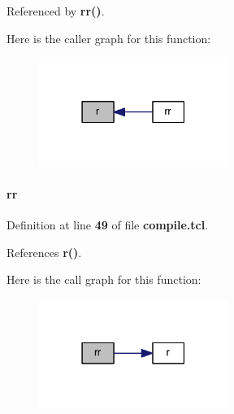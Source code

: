 Referenced by {\bf rr()}.



Here is the caller graph for this function\+:\nopagebreak
\begin{figure}[H]
\begin{center}
\leavevmode
\includegraphics[width=174pt]{d6/d9c/txiqmux_2compile_8tcl_a514f1b439f404f86f77090fa9edc96ce_icgraph}
\end{center}
\end{figure}


\paragraph[{rr}]{\setlength{\rightskip}{0pt plus 5cm}rr}\label{txiqmux_2compile_8tcl_aeb9279982226a42afdf2860dbdc29b45}


Definition at line {\bf 49} of file {\bf compile.\+tcl}.



References {\bf r()}.



Here is the call graph for this function\+:\nopagebreak
\begin{figure}[H]
\begin{center}
\leavevmode
\includegraphics[width=174pt]{d6/d9c/txiqmux_2compile_8tcl_aeb9279982226a42afdf2860dbdc29b45_cgraph}
\end{center}
\end{figure}


